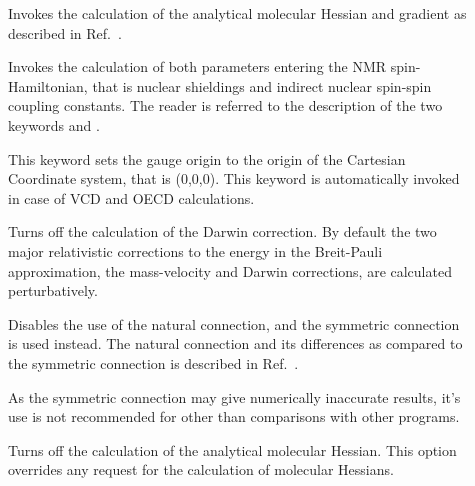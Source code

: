 \begin{description}
\item[] Invokes the calculation of the analytical
molecular Hessian and gradient as
described in Ref.~\cite{tuhjahjajpjjcp84}. 


\item[] Invokes the calculation of both parameters
entering the NMR spin-Hamiltonian, that is nuclear
shieldings and
indirect nuclear spin-spin coupling
constants. The reader is referred to the 
description of the two keywords  and .

\item[] This keyword sets the gauge
origin  to the origin of the Cartesian Coordinate system,
that is (0,0,0). This keyword is automatically invoked in case of VCD
and OECD calculations.

\item[] Turns off the calculation of the Darwin
correction. By default the two major relativistic
corrections to the energy in the Breit-Pauli approximation, the
mass-velocity and Darwin 
corrections, are calculated 
perturbatively.

\item[] Disables the use of the natural
connection, and 
the symmetric connection is used instead. The
natural connection and 
its differences as compared to the symmetric connection is described
in Ref.~\cite{joklbkrthpjtca90,krthjopjklbcpl235}. 

As the symmetric connection may give numerically inaccurate results,
it's use is not recommended for other than comparisons with other
programs.

\item[] Turns off the calculation of the analytical
molecular Hessian. This option overrides any request for the
calculation of molecular Hessians.


\end{description}
